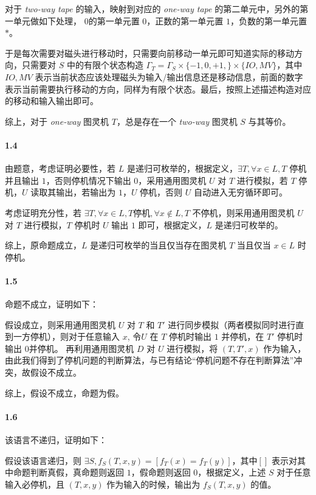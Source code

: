 \documentclass[12pt, a4paper, oneside]{ctexart}
\begin{document}
	对于 \textit{two-way tape} 的输入，映射到对应的 \textit{one-way tape} 的第二单元中，另外的第一单元做如下处理， $0$的第一单元置 $0$，正数的第一单元置 $1$，负数的第一单元置 $*$。
	
	于是每次需要对磁头进行移动时，只需要向前移动一单元即可知道实际的移动方向，只需要对 $S$ 中的有限个状态构造 $\Gamma_T=\Gamma_S\times\{-1,0,+1,\}\times\{IO,MV\}$，其中 $IO,MV$ 表示当前状态应该处理磁头为输入/输出信息还是移动信息，前面的数字表示当前需要执行移动的方向，同样为有限个状态。最后，按照上述描述构造对应的移动和输入输出即可。
	
	综上，对于 \textit{one-way} 图灵机 $T$，总是存在一个 \textit{two-way} 图灵机 $S$ 与其等价。
	\paragraph{1.4}
	由题意，考虑证明必要性，若 $L$ 是递归可枚举的，根据定义，$\exists T,\forall x\in L, T$ 停机并且输出 $1$，否则停机情况下输出 $0$，采用通用图灵机 $U$ 对 $T$ 进行模拟，若 $T$ 停机，$U$ 读取其输出，若输出为 $1$，$U$ 停机，否则 $U$ 自动进入无穷循环即可。
	
	考虑证明充分性，若 $\exists T,\forall x\in L, T $停机$, \forall x\notin L, T$ 不停机，则采用通用图灵机 $U$ 对 $T$ 进行模拟，$T$ 停机时 $U$ 输出 $1$ 即可，根据定义，$L$ 是递归可枚举的。
	
	综上，原命题成立，$L$ 是递归可枚举的当且仅当存在图灵机 $T$ 当且仅当 $x\in L$ 时停机。
	\paragraph{1.5}
	命题不成立，证明如下：
	
	假设成立，则采用通用图灵机 $U$ 对 $T$ 和 $T'$ 进行同步模拟（两者模拟同时进行直到一方停机），则对于任意输入 $x$, 令$U$ 在 $T$ 停机时输出 $1$ 并停机，在 $T'$ 停机时输出 $0$并停机。
	再利用通用图灵机 $D$ 对 $U$ 进行模拟，将 $(T,T',x)$ 作为输入，由此我们得到了停机问题的判断算法，与已有结论“停机问题不存在判断算法”冲突，故假设不成立。
	
	综上，假设不成立，命题为假。
	\paragraph{1.6}
	该语言不递归，证明如下：
	
	假设该语言递归，则 $\exists S, f_S(T,x,y) = [f_T(x)=f_T(y)]$，其中$[]$ 表示对其中命题判断真假，真命题则返回 $1$，假命题则返回 $0$，根据定义，上述 $S$ 对于任意输入必停机，且 $(T,x,y)$ 作为输入的时候，输出为 $f_S(T,x,y)$ 的值。
	
\end{document}
